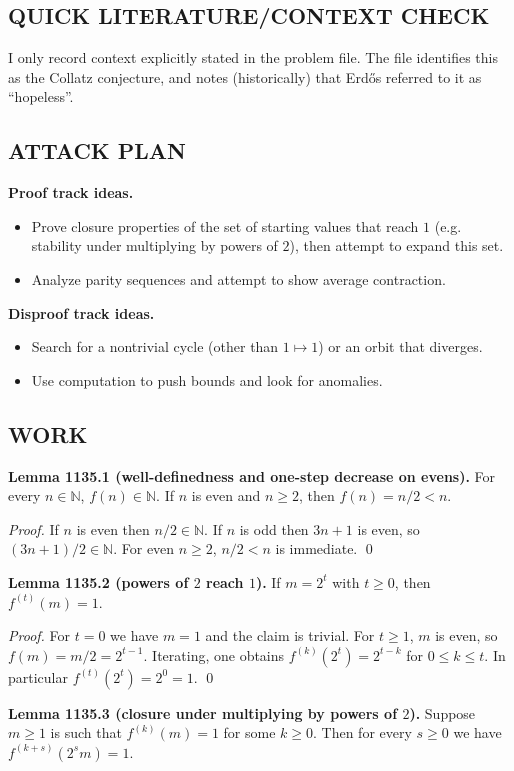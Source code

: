 \subsection*{QUICK LITERATURE/CONTEXT CHECK}
I only record context explicitly stated in the problem file.
The file identifies this as the Collatz conjecture, and notes (historically) that Erd\H{o}s referred to it as ``hopeless''.

\subsection*{ATTACK PLAN}
\textbf{Proof track ideas.}
\begin{itemize}
\item Prove closure properties of the set of starting values that reach $1$ (e.g. stability under multiplying by powers of $2$), then attempt to expand this set.
\item Analyze parity sequences and attempt to show average contraction.
\end{itemize}
\textbf{Disproof track ideas.}
\begin{itemize}
\item Search for a nontrivial cycle (other than $1\mapsto 1$) or an orbit that diverges.
\item Use computation to push bounds and look for anomalies.
\end{itemize}

\subsection*{WORK}
\textbf{Lemma 1135.1 (well-definedness and one-step decrease on evens).}
For every $n\in\mathbb{N}$, $f(n)\in\mathbb{N}$. If $n$ is even and $n\ge 2$, then $f(n)=n/2<n$.

\emph{Proof.}
If $n$ is even then $n/2\in\mathbb{N}$.
If $n$ is odd then $3n+1$ is even, so $(3n+1)/2\in\mathbb{N}$.
For even $n\ge 2$, $n/2<n$ is immediate.
\qed

\textbf{Lemma 1135.2 (powers of $2$ reach $1$).}
If $m=2^t$ with $t\ge 0$, then $f^{(t)}(m)=1$.

\emph{Proof.}
For $t=0$ we have $m=1$ and the claim is trivial.
For $t\ge 1$, $m$ is even, so $f(m)=m/2=2^{t-1}$.
Iterating, one obtains $f^{(k)}(2^t)=2^{t-k}$ for $0\le k\le t$.
In particular $f^{(t)}(2^t)=2^0=1$.
\qed

\textbf{Lemma 1135.3 (closure under multiplying by powers of $2$).}
Suppose $m\ge 1$ is such that $f^{(k)}(m)=1$ for some $k\ge 0$.
Then for every $s\ge 0$ we have $f^{(k+s)}(2^s m)=1$.

